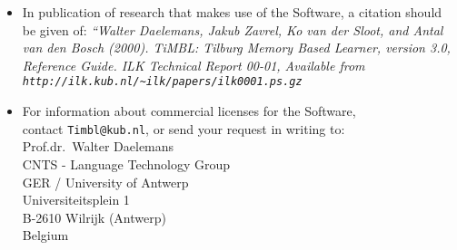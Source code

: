 \documentclass{report}
\begin{document}
\begin{itemize}
\item In publication of research that makes use of the Software, a
citation should be given of: {\em ``Walter Daelemans, Jakub Zavrel, Ko
van der Sloot, and Antal van den Bosch (2000). TiMBL: Tilburg Memory
Based Learner, version 3.0, Reference Guide. ILK Technical Report
00-01, Available from {\tt
http://ilk.kub.nl/\~{}ilk/papers/ilk0001.ps.gz}}

\item For information about commercial licenses for the Software,\\
contact {\tt Timbl@kub.nl}, or send your request in writing to:\\

Prof.dr.~Walter Daelemans\\
CNTS - Language Technology Group\\
GER / University of Antwerp\\
Universiteitsplein 1\\
B-2610 Wilrijk (Antwerp)\\
Belgium\\

\end{itemize}

\pagestyle{headings}
\end{document}
